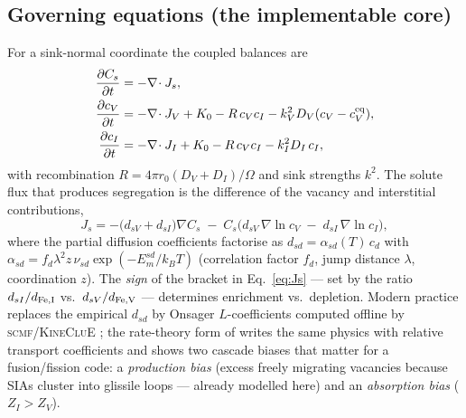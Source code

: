 \documentclass[11pt]{article}
\newcommand{\cv}{c_{V}}
\newcommand{\ci}{c_{I}}
\newcommand{\Dv}{D_{V}}
\newcommand{\Di}{D_{I}}
\newcommand{\Cs}{C_{s}}
\begin{document}
\subsection{Governing equations (the implementable core)}
For a sink-normal coordinate the coupled balances are
\citep{WiedersichOkamotoLam1979,AllenWas1998}
\begin{align}
\frac{\partial \Cs}{\partial t} &= -\nabla\!\cdot J_s, \\
\frac{\partial \cv}{\partial t} &= -\nabla\!\cdot J_V + K_0 - R\,\cv\ci - k_V^2 \Dv(\cv-\cv^{\rm eq}),\\
\frac{\partial \ci}{\partial t} &= -\nabla\!\cdot J_I + K_0 - R\,\cv\ci - k_I^2 \Di\,\ci,
\end{align}
with recombination $R=4\pi r_0(\Dv+\Di)/\Omega$ and sink strengths $k^2$. The
solute flux that produces segregation is the difference of the vacancy and
interstitial contributions,
\begin{equation}
\boxed{\,
J_s = -\big(d_{sV}+d_{sI}\big)\nabla \Cs
      \;-\;\Cs\big(d_{sV}\,\nabla\!\ln\cv \;-\; d_{sI}\,\nabla\!\ln\ci\big),
\,}
\label{eq:Js}
\end{equation}
where the partial diffusion coefficients factorise as
$d_{sd}=\alpha_{sd}(T)\,c_d$ with
$\alpha_{sd}=f_d\lambda^2 z\,\nu_{sd}\exp(-E_m^{sd}/k_BT)$
(correlation factor $f_d$, jump distance $\lambda$, coordination $z$).
The \emph{sign} of the bracket in Eq.~\eqref{eq:Js} --- set by the ratio
$d_{sI}/d_{\rm Fe,I}$ vs.\ $d_{sV}/d_{\rm Fe,V}$ --- determines enrichment vs.\
depletion. Modern practice replaces the empirical $d_{sd}$ by Onsager
$L$-coefficients computed offline by \textsc{scmf}/\textsc{KineCluE}
\citep{NastarSoisson2020,SchulerMessinaNastar2020}; the rate-theory form of
\citet{Oplinger2026} writes the same physics with relative transport
coefficients and shows two cascade biases that matter for a fusion/fission
code: a \emph{production bias} (excess freely migrating vacancies because SIAs
cluster into glissile loops --- already modelled here) and an
\emph{absorption bias} ($Z_I>Z_V$).
\end{document}
